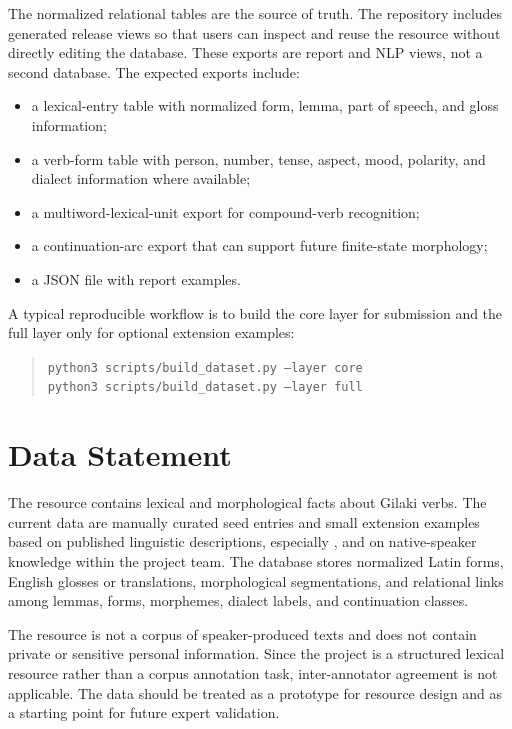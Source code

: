 \documentclass[11pt]{article}
\newcommand{\code}[1]{\texttt{#1}}
\begin{document}
The normalized relational tables are the source of truth. The repository includes generated release views so that users can inspect and reuse the resource without directly editing the database. These exports are report and NLP views, not a second database. The expected exports include:
\begin{itemize}[leftmargin=*]
    \item a lexical-entry table with normalized form, lemma, part of speech, and gloss information;
    \item a verb-form table with person, number, tense, aspect, mood, polarity, and dialect information where available;
    \item a multiword-lexical-unit export for compound-verb recognition;
    \item a continuation-arc export that can support future finite-state morphology;
    \item a JSON file with report examples.
\end{itemize}

A typical reproducible workflow is to build the core layer for submission and the full layer only for optional extension examples:
\begin{quote}\small
\code{python3 scripts/build\_dataset.py --layer core}\\
\code{python3 scripts/build\_dataset.py --layer full}
\end{quote}

\section{Data Statement}

The resource contains lexical and morphological facts about Gilaki verbs. The current data are manually curated seed entries and small extension examples based on published linguistic descriptions, especially \citet{rastorgueva2012gilaki}, and on native-speaker knowledge within the project team. The database stores normalized Latin forms, English glosses or translations, morphological segmentations, and relational links among lemmas, forms, morphemes, dialect labels, and continuation classes.

The resource is not a corpus of speaker-produced texts and does not contain private or sensitive personal information. Since the project is a structured lexical resource rather than a corpus annotation task, inter-annotator agreement is not applicable. The data should be treated as a prototype for resource design and as a starting point for future expert validation.
\end{document}
